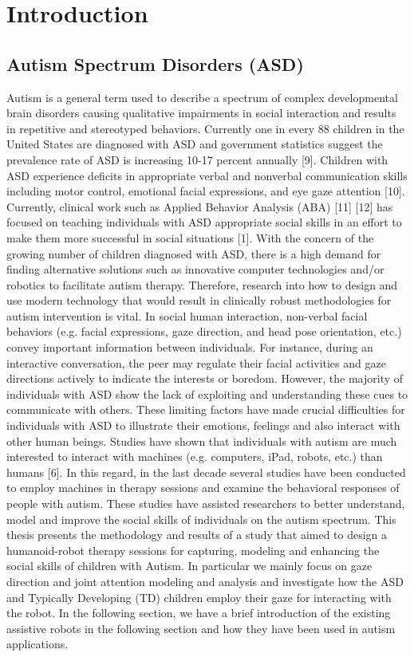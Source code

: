 \chapter{Introduction}



\section{Autism Spectrum Disorders (ASD)}
Autism is a general term used to describe a spectrum of complex developmental
brain disorders causing qualitative impairments in social interaction and results in
repetitive and stereotyped behaviors. Currently one in every 88 children in the United
States are diagnosed with ASD and government statistics suggest the prevalence rate of
ASD is increasing 10-17 percent annually [9]. Children with ASD experience deficits in
appropriate verbal and nonverbal communication skills including motor control, emotional
facial expressions, and eye gaze attention [10]. Currently, clinical work such as Applied
Behavior Analysis (ABA) [11] [12] has focused on teaching individuals with ASD
appropriate social skills in an effort to make them more successful in social situations [1].
With the concern of the growing number of children diagnosed with ASD, there is a high
demand for finding alternative solutions such as innovative computer technologies and/or
robotics to facilitate autism therapy. Therefore, research into how to design and use modern
technology that would result in clinically robust methodologies for autism intervention is
vital.
In social human interaction, non-verbal facial behaviors (e.g. facial expressions,
gaze direction, and head pose orientation, etc.) convey important information between
individuals. For instance, during an interactive conversation, the peer may regulate their
facial activities and gaze directions actively to indicate the interests or boredom. However,
the majority of individuals with ASD show the lack of exploiting and understanding these
cues to communicate with others. These limiting factors have made crucial difficulties for
individuals with ASD to illustrate their emotions, feelings and also interact with other
human beings. Studies have shown that individuals with autism are much interested to
interact with machines (e.g. computers, iPad, robots, etc.) than humans [6]. In this regard,
in the last decade several studies have been conducted to employ machines in therapy
sessions and examine the behavioral responses of people with autism. These studies have
assisted researchers to better understand, model and improve the social skills of individuals
on the autism spectrum.
This thesis presents the methodology and results of a study that aimed to design a
humanoid-robot therapy sessions for capturing, modeling and enhancing the social skills
of children with Autism. In particular we mainly focus on gaze direction and joint attention
modeling and analysis and investigate how the ASD and Typically Developing (TD)
children employ their gaze for interacting with the robot. In the following section, we have
a brief introduction of the existing assistive robots in the following section and how they
have been used in autism applications.

